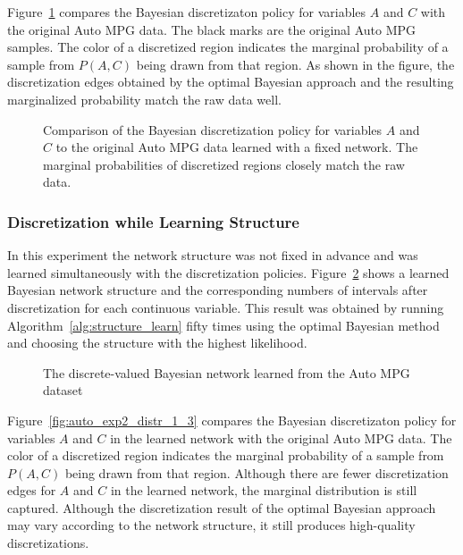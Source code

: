 Figure~\ref{fig:auto_exp1_distr_1_3} compares the Bayesian discretizaton policy for variables $A$ and $C$ with the original Auto MPG data.
The black marks are the original Auto MPG samples.
The color of a discretized region indicates the marginal probability of a sample from $P(A,C)$ being drawn from that region.
As shown in the figure, the discretization edges obtained by the optimal Bayesian approach and the resulting marginalized probability match the raw data well.

\begin{figure}[ht]
\centering
  
  \caption{
    Comparison of the Bayesian discretization policy for variables $A$ and $C$ to the original Auto MPG data learned with a fixed network.
    The marginal probabilities of discretized regions closely match the raw data.
  }
  \label{fig:auto_exp1_distr_1_3}
\end{figure}

\subsubsection{Discretization while Learning Structure}
\label{subsubsec:auto_exp2}

In this experiment the network structure was not fixed in advance and was learned simultaneously with the discretization policies.
Figure~\ref{fig:auto_graph_2} shows a learned Bayesian network structure and the corresponding numbers of intervals after discretization for each continuous variable.
This result was obtained by running Algorithm~\ref{alg:structure_learn} fifty times using the optimal Bayesian method and choosing the structure with the highest likelihood.

\begin{figure}[ht]
  \centering
  
  \caption{The discrete-valued Bayesian network learned from the Auto MPG dataset}
  \label{fig:auto_graph_2}
\end{figure}

Figure~\ref{fig:auto_exp2_distr_1_3} compares the Bayesian discretizaton policy for variables $A$ and $C$ in the learned network with the original Auto MPG data.
The color of a discretized region indicates the marginal probability of a sample from $P(A,C)$ being drawn from that region.
Although there are fewer discretization edges for $A$ and $C$ in the learned network, the marginal distribution is still captured.
Although the discretization result of the optimal Bayesian approach may vary according to the network structure, it still produces high-quality discretizations.

